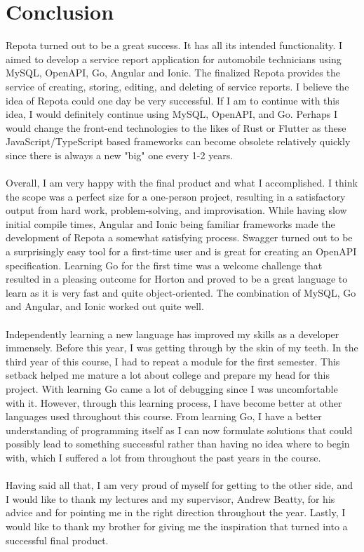 \chapter{Conclusion}
Repota turned out to be a great success. It has all its intended functionality. I aimed to develop a service report application for automobile technicians using MySQL, OpenAPI, Go, Angular and Ionic. The finalized Repota provides the service of creating, storing, editing, and deleting of service reports. I believe the idea of Repota could one day be very successful. If I am to continue with this idea, I would definitely continue using MySQL, OpenAPI, and Go. Perhaps I would change the front-end technologies to the likes of Rust or Flutter as these JavaScript/TypeScript based frameworks can become obsolete relatively quickly since there is always a new "big" one every 1-2 years.  
\\\\ Overall, I am very happy with the final product and what I accomplished. I think the scope was a perfect size for a one-person project, resulting in a satisfactory output from hard work, problem-solving, and improvisation. While having slow initial compile times, Angular and Ionic being familiar frameworks made the development of Repota a somewhat satisfying process. Swagger turned out to be a surprisingly easy tool for a first-time user and is great for creating an OpenAPI specification. Learning Go for the first time was a welcome challenge that resulted in a pleasing outcome for Horton and proved to be a great language to learn as it is very fast and quite object-oriented. The combination of MySQL, Go and Angular, and Ionic worked out quite well.
\\\\ Independently learning a new language has improved my skills as a developer immensely. Before this year, I was getting through by the skin of my teeth. In the third year of this course, I had to repeat a module for the first semester. This setback helped me mature a lot about college and prepare my head for this project. With learning Go came a lot of debugging since I was uncomfortable with it. However, through this learning process, I have become better at other languages used throughout this course. From learning Go, I have a better understanding of programming itself as I can now formulate solutions that could possibly lead to something successful rather than having no idea where to begin with, which I suffered a lot from throughout the past years in the course.
\\\\ Having said all that, I am very proud of myself for getting to the other side, and I would like to thank my lectures and my supervisor, Andrew Beatty, for his advice and for pointing me in the right direction throughout the year. Lastly, I would like to thank my brother for giving me the inspiration that turned into a successful final product.